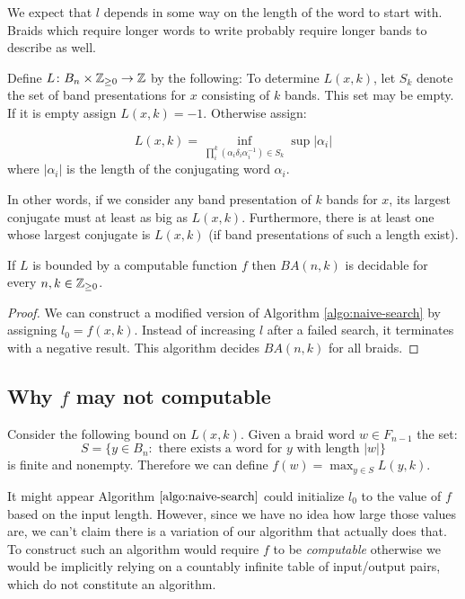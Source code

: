\documentclass[12pt]{thesis}
\begin{document}
We expect that $l$ depends in some way on the length
of the word to start with.
Braids which require longer words to write
probably require longer bands to describe as well.

    Define $L \colon B_{n} \times \mathbb{Z}_{\geq 0} \rightarrow \mathbb{Z}$
    by the following:
    To determine $L(x, k)$,
    let $S_{k}$ denote the set of band presentations for $x$ 
    consisting of $k$ bands.
    This set may be empty.
    If it is empty assign $L(x, k) = -1$.
    Otherwise assign:

    \begin{equation}
        L(x, k) = \inf_{\prod_{i}^{k} (\alpha_{i} \delta_{i} \alpha_{i}^{-1}) \in S_{k}} \sup |\alpha_{i}|
    \end{equation}
    where $|\alpha_{i}|$ is the length of the conjugating word $\alpha_{i}$.

    In other words, if we consider any band presentation of $k$ bands for $x$,
    its largest conjugate must at least as big as $L(x, k)$.
    Furthermore, there is at least one whose largest conjugate is $L(x, k)$ (if band presentations of such a length exist).

\begin{theorem}
    \label{th:decidable}
    If $L$ is bounded by a computable function $f$ then $BA(n, k)$ is decidable
    for every $n, k \in \mathbb{Z}_{\geq 0}$.
\end{theorem}

\begin{proof}
    We can construct a modified version of Algorithm \ref{algo:naive-search}
    by assigning $l_{0} = f(x, k)$.
    Instead of increasing $l$ after a failed search,
    it terminates with a negative result.
    This algorithm decides $BA(n, k)$ for all braids.
\end{proof}

\subsection{Why $f$ may not computable}

Consider the following bound on $L(x, k)$.
Given a braid word $w \in F_{n-1}$ 
the set: 
\[
    S = \{ y \in B_{n} \colon \text{ there exists a word for $y$ with length } |w| \}
\] is finite and nonempty.
Therefore we can define $f(w) = \max_{y \in S} L(y, k)$.

It might appear Algorithm $\ref{algo:naive-search}$ could initialize $l_{0}$ 
to the value of $f$ based on the input length.
However, since we have no idea how large those values are, we can't claim
there is a variation of our algorithm that 
actually does that.
To construct such an algorithm would require $f$ to be \textit{computable}
otherwise we would be implicitly relying  on a countably infinite table of input/output pairs,
which do not constitute an algorithm.
\end{document}
